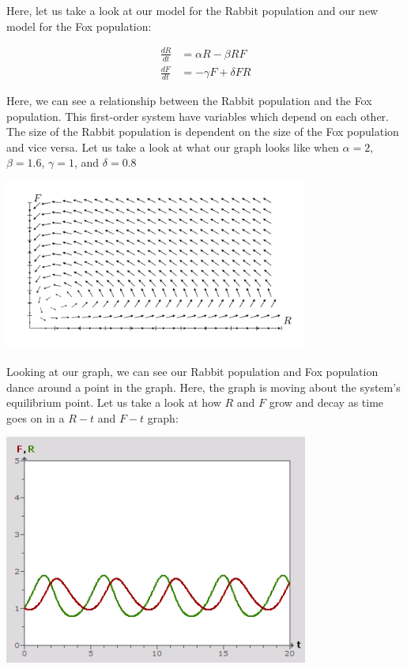 \documentclass{amsart}
\theoremstyle{definition}
\numberwithin{equation}{section}
\begin{document}
\begin{sansmath}
Here, let us take a look at our model for the Rabbit population and our new model for the Fox population:

\begin{align*}
  \frac{dR}{dt} & = \alpha R - \beta RF\\
  \frac{dF}{dt} & = -\gamma F + \delta FR
\end{align*}

Here, we can see a relationship between the Rabbit population and the Fox population. This first-order system have variables which depend on each other. The size of the Rabbit population is dependent on the size of the Fox population and vice versa.
Let us take a look at what our graph looks like when $\alpha = 2$, $\beta = 1.6$, $\gamma = 1$, and $\delta = 0.8$

\begin{center}
  \includegraphics[width=10cm]{PredatorPreyModel}
\end{center}


Looking at our graph, we can see our Rabbit population and Fox population dance around a point in the graph. Here, the graph is moving about the system's equilibrium point. Let us take a look at how $R$ and $F$ grow and decay as time goes on in a $R-t$ and $F-t$ graph:

\begin{center}
  \includegraphics[width=10cm]{RT Graph}
\end{center}


\end{sansmath}
\end{document}
